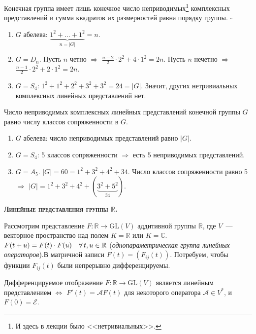 \documentclass[a4paper]{article}
\newcommand*{\tema}[1]{\vspace{20pt}
\begin{center}{\textbf{\textsc{#1.}}}\vspace{5pt}
\end{center}}
\newcommand*{\p}[1]{#1\nobreak\discretionary{}{\hbox{$\mathsurround=0pt #1$}}{}}
\begin{document}
\begin{imp}
Конечная группа имеет лишь конечное число неприводимых\footnote{И
здесь в лекции было <<нетривиальных>>.} комплексных представлений и
сумма квадратов их размерностей равна порядку группы. $\square$
\end{imp}

\begin{ex}
\begin{enumerate}
  \item $G$ абелева: $\underbrace{1^2+\ldots+1^2}_{n=|G|}=n$.
  \item $G=D_n$. Пусть $n$ четно $\Rightarrow$ $\frac{n-2}{2}\cdot 2^2+4\cdot
  1^2=2n$. Пусть $n$ нечетно $\Rightarrow$ $\frac{n-1}{2}\cdot 2^2+2\cdot
  1^2=2n$.
  \item $G=S_4$: $1^2+1^2+2^2+3^2+3^2=24=|G|$. Значит, других
  нетривиальных комплексных линейных представлений нет.
\end{enumerate}
\end{ex}

\begin{theorem}
Число неприводимых комплексных линейных представлений конечной
группы $G$ равно числу классов сопряженности в $G$.
\end{theorem}

\begin{ex}
\begin{enumerate}
  \item $G$ абелева: число неприводимых представлений равно $|G|$.
  \item $G=S_4$: 5 классов сопряженности $\Rightarrow$ есть 5
  неприводимых представлений.
  \item $G=A_5$. $|G|=60=1^2+3^2+4^2+34$. Число классов
  сопряженности равно 5 $\Rightarrow$
  $|G|=1^2+3^2+4^2+(\underbrace{3^2+5^2}_{34})$.
\end{enumerate}
\end{ex}

\tema{Линейные представления группы $\mathbb{R}$}

Рассмотрим представление $F\colon \mathbb{R}\to \mathrm{GL}(V)$
аддитивной группы $\mathbb{R}$, где $V$~--- векторное пространство
над полем $K=\mathbb{R}$ или $K=\mathbb{C}$. $F(t+u)\p=F(t)\cdot
F(u)\quad \forall \, t,u\in\mathbb{R}$ (\emph{однопараметрическая
группа линейных операторов}).В матричной записи $F(t)=(F_{ij}(t))$.
Потребуем, чтобы функции $F_{ij}(t)$ были непрерывно
дифференцируемы.

\begin{theorem}
Дифференцируемое отображение $F\colon \mathbb{R}\to \mathrm{GL}(V)$
является линейным представлением $\Leftrightarrow$
$F'(t)=\mathcal{A}F(t)$ для некоторого оператора $\mathcal{A}\in
V^*$, и $F(0)=\mathcal{E}$.
\end{theorem}
\end{document}
